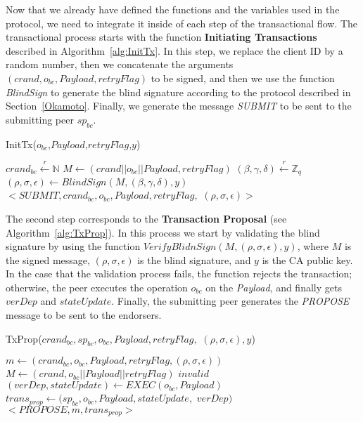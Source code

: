 \documentclass[conference]{IEEEtran}
\begin{document}
Now that we already have defined the functions and the variables used in the protocol, we need to integrate it inside of each step of the transactional flow. The transactional process starts with the function \textbf{Initiating Transactions} described in Algorithm~\ref{alg:InitTx}. In this step, we replace the client ID by a random number, then we concatenate the arguments $(crand,o_{bc},Payload,retryFlag)$ to be signed, and then we use the function \textit{BlindSign} to generate the blind signature according to the protocol described in Section~\ref{Okamoto}. Finally, we generate the message \textit{SUBMIT} to be sent to the submitting peer $sp_{bc}$.

\begin{algorithm}[ht]
\caption{InitTx($o_{bc}$,$Payload$,$retryFlag$,$y$)}
\label{alg:InitTx}
\begin{algorithmic}[1]
\STATE $crand_{bc}\xleftarrow[]{r}\mathbb{N}$            
\STATE $M \gets (crand||o_{bc}||Payload,retryFlag)$
\STATE $(\beta,\gamma,\delta)\xleftarrow[]{r}\mathbb{Z}_q$  
\STATE $(\rho,\sigma,\epsilon) \gets BlindSign(M,(\beta,\gamma,\delta),y)$
\RETURN $<\textit{SUBMIT},crand_{bc},o_{bc},Payload,retryFlag,$ $(\rho,\sigma,\epsilon)>$
\end{algorithmic}
\end{algorithm}

The second step corresponds to the \textbf{Transaction Proposal} (see Algorithm~\ref{alg:TxProp}). In this process we start by validating the blind signature by using the function $VerifyBlidnSign(M,(\rho,\sigma,\epsilon),y)$, where $M$ is the signed message, $(\rho,\sigma,\epsilon)$ is the blind signature, and $y$ is the CA public key. In the case that the validation process fails, the function rejects the transaction; otherwise, the peer executes the operation $o_{bc}$ on the \textit{Payload}, and finally gets $verDep$ and $stateUpdate$. Finally, the submitting peer generates the \textit{PROPOSE} message to be sent to the endorsers.

\begin{algorithm}[ht]
\caption{TxProp($crand_{bc},sp_{bc},o_{bc},Payload,retryFlag,$ $(\rho,\sigma,\epsilon),y$)}
\label{alg:TxProp}
\begin{algorithmic}[1]
\STATE $m \gets (crand_{bc},o_{bc},Payload,retryFlag,(\rho,\sigma,\epsilon))$
\STATE $M \gets (crand,o_{bc}||Payload||retryFlag)$
  \RETURN $invalid$ \ELSE
\STATE $(verDep,stateUpdate) \gets EXEC(o_{{bc}},Payload)$ 
\STATE $trans_{prop} \gets (sp_{bc},o_{bc},Payload,stateUpdate,$ $verDep)$
\RETURN $<\textit{PROPOSE},m,trans_{prop}>$
\ENDIF
\end{algorithmic}
\end{algorithm}
\end{document}
